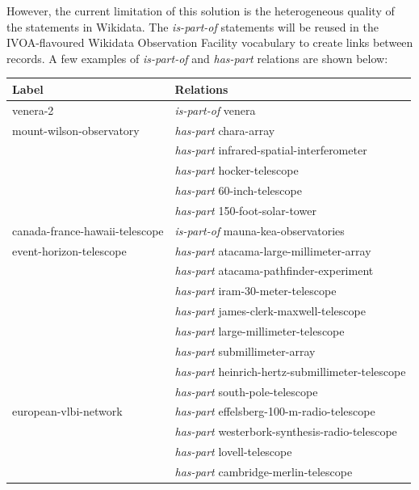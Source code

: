\documentclass[11pt,a4paper]{ivoa}
\begin{document}
However, the current limitation of this solution is the heterogeneous
quality of the statements in Wikidata. The \emph{is-part-of}
statements will be reused in the IVOA-flavoured Wikidata Observation
Facility vocabulary to create links between records. A few examples of
\emph{is-part-of} and \emph{has-part} relations are shown below:
{\small \noindent\begin{longtable}{p{}p{}}
\textbf{Label} & \textbf{Relations}\\
\hline
\hline
venera-2  & \emph{is-part-of} venera\\
\hline
mount-wilson-observatory & \emph{has-part} chara-array\\
                         & \emph{has-part} infrared-spatial-interferometer\\
                         & \emph{has-part} hocker-telescope\\
                         & \emph{has-part} 60-inch-telescope\\
                         & \emph{has-part} 150-foot-solar-tower\\
\hline
canada-france-hawaii-telescope & \emph{is-part-of} mauna-kea-observatories\\
\hline
event-horizon-telescope & \emph{has-part} atacama-large-millimeter-array\\
                        & \emph{has-part} atacama-pathfinder-experiment\\
                        & \emph{has-part} iram-30-meter-telescope\\
                        & \emph{has-part} james-clerk-maxwell-telescope\\
                        & \emph{has-part} large-millimeter-telescope\\
                        & \emph{has-part} submillimeter-array\\
                        & \emph{has-part} heinrich-hertz-submillimeter-telescope\\
                        & \emph{has-part} south-pole-telescope\\
\hline
european-vlbi-network   & \emph{has-part} effelsberg-100-m-radio-telescope\\
                        & \emph{has-part} westerbork-synthesis-radio-telescope\\
                        & \emph{has-part} lovell-telescope\\
                        & \emph{has-part} cambridge-merlin-telescope\\

\end{longtable}}
\end{document}
